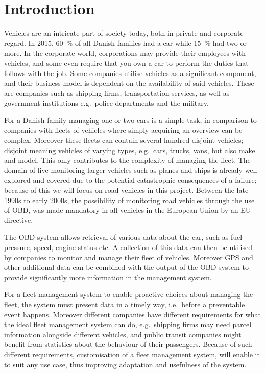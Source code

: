 \chapter{Introduction}
Vehicles are an intricate part of society today, both in private and corporate regard.
In 2015, 60~\% of all Danish families had a car while 15~\% had two or more\cite{MoreCarsInFamilies}.
In the corporate world, corporations may provide their employees with vehicles,
and some even require that you own a car to perform the duties that follows with the job.
Some companies utilise vehicles as a significant component,
and their business model is dependent on the availability of said vehicles.
These are companies such as shipping firms, transportation services,
as well as government institutions e.g.~police departments and the military.

For a Danish family managing one or two cars is a simple task,
in comparison to companies with fleets of vehicles where simply acquiring an overview can be complex.
Moreover these fleets can contain several hundred disjoint vehicles;
disjoint meaning vehicles of varying types, e.g.~cars, trucks, vans, but also make and model.
This only contributes to the complexity of managing the fleet.
The domain of live monitoring larger vehicles such as planes and ships is already well explored and covered
due to the potential catastrophic consequences of a failure;
because of this we will focus on road vehicles in this project.
Between the late 1990s to early 2000s, the possibility of monitoring road vehicles through the use of \acl{OBD},
was made mandatory in all vehicles in the European Union by an EU directive\cite{EUDirective}.

The \ac{OBD} system allows retrieval of various data about the car, such as fuel pressure, speed, engine status etc.
A collection of this data can then be utilised by companies to monitor and manage their fleet of vehicles.
Moreover GPS and other additional data can be combined with the output of the \ac{OBD} system
to provide significantly more information in the management system.

For a fleet management system to enable proactive choices about managing the fleet,
the system must present data in a timely way, i.e.~before a preventable event happens.
Moreover different companies have different requirements for what the ideal fleet management system can do,
e.g.~shipping firms may need parcel information alongside different vehicles,
and public transit companies might benefit from statistics about the behaviour of their passengers.
Because of such different requirements, customisation of a fleet management system,
will enable it to suit any use case, thus improving adaptation and usefulness of the system.

